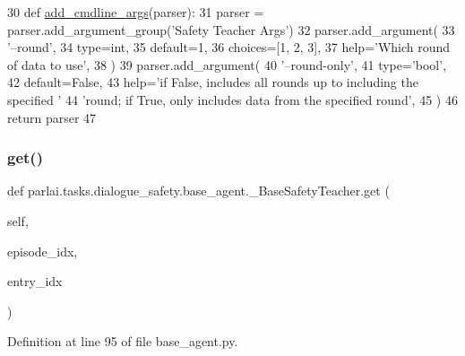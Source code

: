 \begin{DoxyCode}
30     \textcolor{keyword}{def }\hyperlink{namespaceparlai_1_1agents_1_1drqa_1_1config_a62fdd5554f1da6be0cba185271058320}{add\_cmdline\_args}(parser):
31         parser = parser.add\_argument\_group(\textcolor{stringliteral}{'Safety Teacher Args'})
32         parser.add\_argument(
33             \textcolor{stringliteral}{'--round'},
34             type=int,
35             default=1,
36             choices=[1, 2, 3],
37             help=\textcolor{stringliteral}{'Which round of data to use'},
38         )
39         parser.add\_argument(
40             \textcolor{stringliteral}{'--round-only'},
41             type=\textcolor{stringliteral}{'bool'},
42             default=\textcolor{keyword}{False},
43             help=\textcolor{stringliteral}{'if False, includes all rounds up to including the specified '}
44             \textcolor{stringliteral}{'round; if True, only includes data from the specified round'},
45         )
46         \textcolor{keywordflow}{return} parser
47 
\end{DoxyCode}
\mbox{\label{classparlai_1_1tasks_1_1dialogue__safety_1_1base__agent_1_1__BaseSafetyTeacher_afde2a1fdb6fa5aa3da3544624f8068b6}} 
\subsubsection{\texorpdfstring{get()}{get()}}
{\footnotesize\ttfamily def parlai.\+tasks.\+dialogue\+\_\+safety.\+base\+\_\+agent.\+\_\+\+Base\+Safety\+Teacher.\+get (\begin{DoxyParamCaption}\item[{}]{self,  }\item[{}]{episode\+\_\+idx,  }\item[{}]{entry\+\_\+idx }\end{DoxyParamCaption})}



Definition at line 95 of file base\+\_\+agent.\+py.


